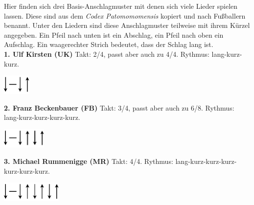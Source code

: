 \begin{intersong}
    \newpage\null
    \begin{center}
    \end{center}
    Hier finden sich drei Basis-Anschlagmuster mit denen sich viele Lieder spielen lassen. Diese sind aus dem \textit{Codex Patomomomensis} kopiert und nach Fußballern benannt. Unter den Liedern sind diese Anschlagmuster teilweise mit ihrem Kürzel angegeben. Ein Pfeil nach unten ist ein Abschlag, ein Pfeil nach oben ein Aufschlag. Ein waagerechter Strich bedeutet, dass der Schlag lang ist. \\
    
    \noindent\textbf{1. Ulf Kirsten (UK)} \newline
    Takt: 2/4, passt aber auch zu 4/4. Rythmus: lang-kurz-kurz.
    \begin{center}
        \includegraphics[height=1cm]{Schm-UK.pdf}
    \end{center}
    
    \noindent\textbf{2. Franz Beckenbauer (FB)} \newline
    Takt: 3/4, passt aber auch zu 6/8. Rythmus: lang-kurz-kurz-kurz-kurz.
    \begin{center}
        \includegraphics[height=1cm]{Schm-FB.pdf}
    \end{center}
    
    \noindent\textbf{3. Michael Rummenigge (MR)} \newline
    Takt: 4/4. Rythmus: lang-kurz-kurz-kurz-kurz-kurz-kurz.
    \begin{center}
        \includegraphics[height=1cm]{Schm-MR.pdf}
    \end{center}
    

\end{intersong}
